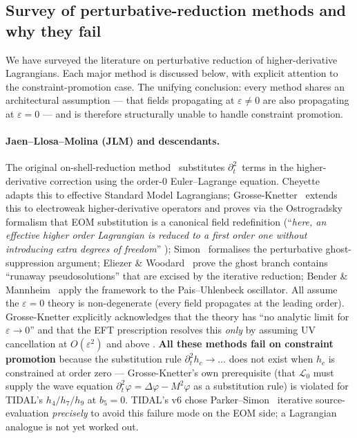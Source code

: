 \subsection{Survey of perturbative-reduction methods and why they fail}
\label{sec:pr-cb-methods}

We have surveyed the literature on perturbative reduction of higher-derivative
Lagrangians.  Each major method is discussed below, with explicit attention
to the constraint-promotion case.  The unifying conclusion: every method
shares an architectural assumption --- that fields propagating at
$\varepsilon \ne 0$ are also propagating at $\varepsilon = 0$ --- and is
therefore structurally unable to handle constraint promotion.

\paragraph{Jaen--Llosa--Molina (JLM) and descendants.}
The original on-shell-reduction method~\cite{JLM1986} substitutes
$\partial_t^2$~terms in the higher-derivative correction using the
order-0 Euler--Lagrange equation.  Cheyette~\cite{Cheyette1988} adapts
this to effective Standard Model Lagrangians; Grosse-Knetter~\cite{GrosseKnetter1994}
extends this to electroweak higher-derivative operators and proves via the
Ostrogradsky formalism that EOM substitution is a canonical field redefinition
(``\emph{here, an effective higher order Lagrangian is reduced to a first order one
without introducing extra degrees of freedom}'' \cite[\S3, p.\,6714]{GrosseKnetter1994});
Simon~\cite{Simon1990}
formalises the perturbative ghost-suppression argument; Eliezer \&
Woodard~\cite{EliezerWoodard1989} prove the ghost branch contains
``runaway pseudosolutions'' that are excised by the iterative reduction;
Bender \& Mannheim~\cite{BenderMannheim2008} apply the framework to
the Pais--Uhlenbeck oscillator.  All assume the $\varepsilon = 0$ theory
is non-degenerate (every field propagates at the leading order).
Grosse-Knetter explicitly acknowledges that the theory has ``no analytic
limit for $\varepsilon\to 0$'' and that the EFT prescription resolves this
\emph{only} by assuming UV cancellation at $O(\varepsilon^2)$ and above
\cite[\S5]{GrosseKnetter1994}.
\textbf{All these methods fail on constraint promotion} because the substitution
rule $\partial_t^2 h_c \to \dots$ does not exist when $h_c$ is constrained
at order zero --- Grosse-Knetter's own prerequisite (that $\mathcal{L}_0$
must supply the wave equation $\partial_t^2\varphi = \Delta\varphi - M^2\varphi$
as a substitution rule) is violated for TIDAL's $h_4/h_7/h_9$ at $b_5=0$.  TIDAL's v6 chose Parker--Simon~\cite{ParkerSimon1993}
iterative source-evaluation \emph{precisely} to avoid this failure mode
on the EOM side; a Lagrangian analogue is not yet worked out.

